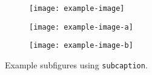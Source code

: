 \begin{figure}[t]
\centering
\begin{subfigure}[t]{.33\linewidth}
    \centering
    \texttt{[image: example-image]}
    \label{fig:exmples-a-b:example-image}
\end{subfigure}%
\begin{subfigure}[t]{.33\linewidth}
    \centering
    \texttt{[image: example-image-a]}
    \label{fig:exmples-a-b:example-image-a}
\end{subfigure}%
\begin{subfigure}[t]{.33\linewidth}
    \centering
    \texttt{[image: example-image-b]}
    \label{fig:exmples-a-b:example-image-b}
\end{subfigure}
\caption{Example subfigures using \texttt{subcaption}.}
\label{fig:exmples-a-b}
\end{figure}
